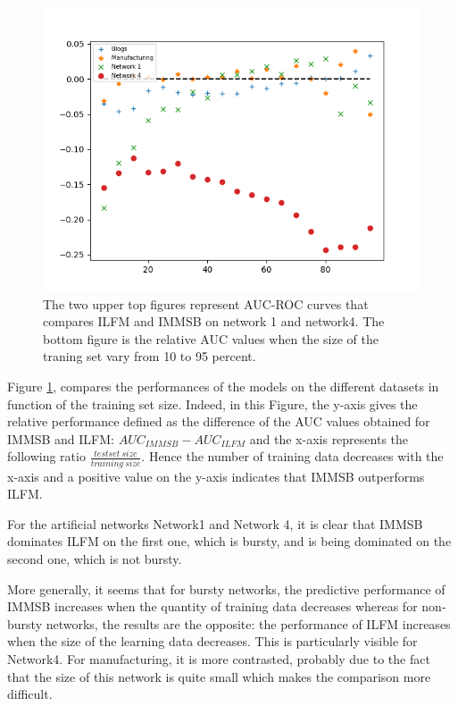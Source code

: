 \begin{figure}[h]
\begin{minipage}{0.4\textwidth}
            \includegraphics[width=\textwidth]{img/corpus/testset_max_20_roc_evolution.png}
        \end{minipage}
        \caption{The two upper top figures represent AUC-ROC curves that compares ILFM and IMMSB on network 1 and network4. The bottom figure is the relative AUC values when the size of the traning set vary from 10 to 95 percent. } 
	\label{fig:auc}
\end{figure}


Figure \ref{fig:auc}, compares the performances of the models on the different datasets in function of  the training set size. Indeed, in this Figure, the y-axis gives the relative performance defined as the difference of the AUC values obtained for IMMSB and ILFM: $AUC_{IMMSB} - AUC_{ILFM}$ and the x-axis represents the following ratio $\frac{testset\ size}{training\ size}$. Hence the number of training data decreases with the x-axis and a positive value on the y-axis indicates that IMMSB outperforms ILFM. 

For the artificial networks Network1 and Network 4, it is clear that IMMSB dominates ILFM on the first one, which is bursty, and is being dominated on the second one, which is not bursty.

More generally, it seems that for bursty networks, the predictive performance of IMMSB increases when the quantity of training data decreases whereas for non-bursty networks, the results are the opposite: the performance of ILFM increases when the size of the learning data decreases. This is particularly visible for Network4. For manufacturing, it is more contrasted, probably due to the fact that the size of this network is quite small which makes the comparison more difficult.


